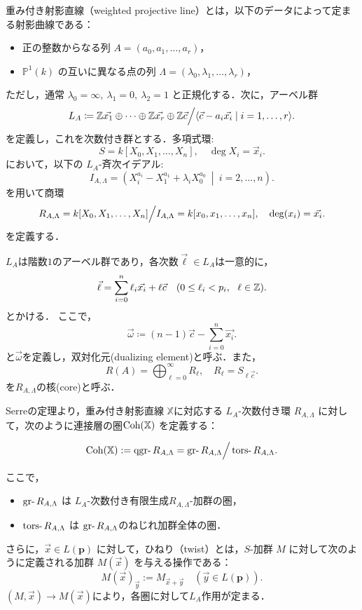 \begin{defn}\cite{GL87}
重み付き射影直線（weighted projective line）とは，以下のデータによって定まる射影曲線である：

\begin{itemize}
  \item 正の整数からなる列 $A = (a_0, a_1, \dots, a_r)$，
  \item $\mathbb{P}^1(k)$ の互いに異なる点の列 $\Lambda = (\lambda_0, \lambda_1, \dots, \lambda_r)$，
\end{itemize}

ただし，通常 $\lambda_0 = \infty,\ \lambda_1 = 0,\ \lambda_2 = 1$ と正規化する．次に，アーベル群
\[
	L_{A} \coloneq {\mathbb Z} \vec{x_1}\oplus\cdots\oplus{\mathbb Z} \vec{x_r}\oplus {\mathbb Z}\vec{c}\Big{/}\langle\vec{c} -a_i\vec{x_i}\mid i=1,\ldots,r\rangle.
\]
を定義し，これを次数付き群とする．多項式環: 
\[
	S = k[X_0, X_1, \dots, X_n], \quad \deg X_i = \vec{x}_i. 
\]
において，以下の $L_A$-斉次イデアル:
\[
	I_{A,\Lambda} = \left( X_i^{a_i} - X_1^{a_1} + \lambda_i X_0^{a_0} \ \middle|\ i = 2, \dots, n \right).
\]
を用いて商環
\[
	R_{A,\Lambda} = k[X_0, X_1, \dots, X_n]\Big{/}I_{A,\Lambda} = k[x_0,x_1,\ldots, x_n],\quad \deg(x_i)=\vec{x_i}.
\]
を定義する．
\end{defn}

$L_A$は階数$1$のアーベル群であり，各次数$\vec{\ell}\in L_A$は一意的に，
\[\vec{\ell} = \sum_{i=0}^n \ell_i\vec{x_i} + \ell\vec{c}\quad (0\le \ell_i < p_i,\ \ \ell \in {\mathbb Z}).\]
とかける．
ここで，
\[\vec{\omega} \coloneq (n-1)\vec{c} - \sum_{i=0}^n\vec{x_i}.\]
と$\vec{\omega}$を定義し，双対化元(dualizing element)と呼ぶ．また，
\[R(A)= \bigoplus_{\ell=0}^\infty R_{\ell},\quad R_\ell = S_{\ell\vec{c}}.\]
を$R_{A,\Lambda}$の核(core)と呼ぶ．

\begin{defn}\cite{GL87}
	Serreの定理より，重み付き射影直線 $\mathbb{X}$に対応する $L_A$-次数付き環 $R_{A,\Lambda}$ に対して，次のように連接層の圏$\operatorname{\mathrm{Coh}}(\mathbb{X})$ を定義する：

\[
\Coh(\mathbb{X}) := \qgr R_{A,\Lambda} = \gr R_{A,\Lambda}\Big{/}\tors R_{A,\Lambda}.
\]

ここで，
\begin{itemize}
	\item $\gr R_{A,\Lambda}$ は $L_A$-次数付き有限生成$R_{A,\Lambda}$-加群の圏，
	\item $\tors R_{A,\Lambda}$ は $\gr R_{A,\Lambda}$のねじれ加群全体の圏．
\end{itemize}
さらに，$\vec{x} \in L(\mathbf{p})$ に対して，ひねり（twist）とは，$S$-加群 $M$ に対して次のように定義される加群 $M(\vec{x})$ を与える操作である：
\[
M(\vec{x})_{\vec{y}} := M_{\vec{x} + \vec{y}} \quad (\vec{y} \in L(\mathbf{p})).
\]
$(M,\vec{x})\to M(\vec{x})$により，各圏に対して$L_A$作用が定まる．
\end{defn}


